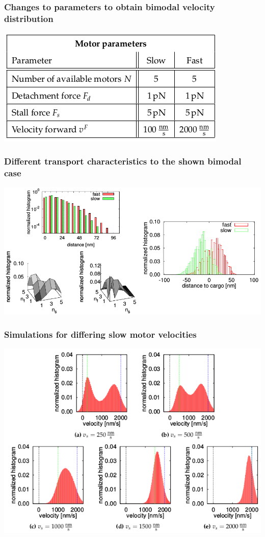 \documentclass[11pt]{beamer}
\begin{document}
\begin{frame}
 \frametitle{Changes to parameters to obtain bimodal velocity distribution}
 \centering
 \includegraphics[scale=.5]{img/params-bimodal-changes.png} 
\end{frame}

\begin{frame}
 \frametitle{Different transport characteristics to the shown bimodal case}
 \centering
 \includegraphics[scale=.5]{img/transport-characteristics.png} 
\end{frame}

\begin{frame}
 \frametitle{Simulations for differing slow motor velocities}
 \centering
 \includegraphics[scale=.5]{img/sim-velo.png} 
\end{frame}
\end{document}
